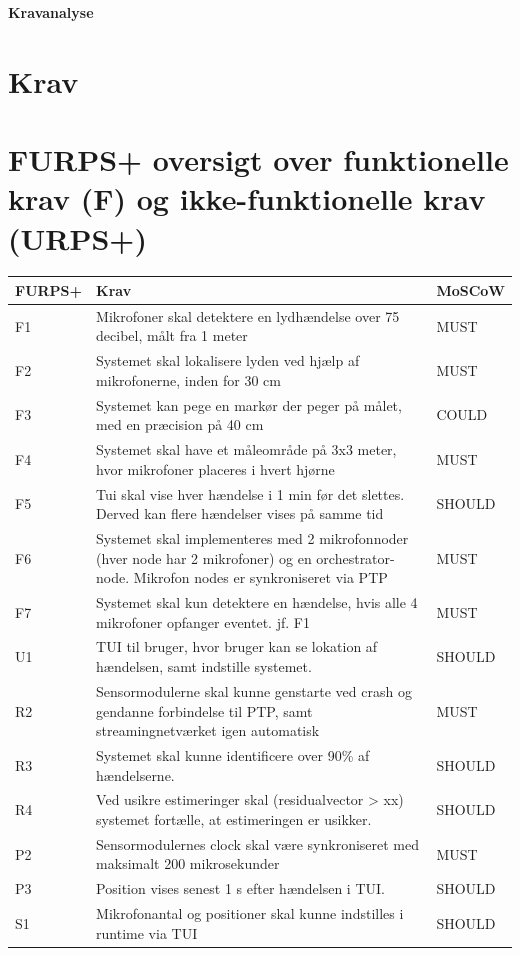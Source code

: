 \documentclass[10pt,addpoints,answers]{exam}
\begin{document}
\begin{center}
{\Huge \textbf{Kravanalyse}\\[0.5em]}
\end{center}

\section*{Krav}




\section*{FURPS+ oversigt over funktionelle krav (F) og ikke-funktionelle krav (URPS+)}
\begin{center}
\renewcommand{\arraystretch}{1.4}
\begin{tabular}{| p{50pt} | p{350pt} | p{50pt} |}
\hline
\textbf{FURPS+} & \textbf{Krav} & \textbf{MoSCoW} \\ \hline
F1 & Mikrofoner skal detektere en lydhændelse over 75 decibel, målt fra 1 meter & MUST \\ \hline
F2 & Systemet skal lokalisere lyden ved hjælp af mikrofonerne, inden for 30 cm & MUST \\ \hline
F3 & Systemet kan pege en markør der peger på målet, med en præcision på 40 cm & COULD \\ \hline
F4 & Systemet skal have et måleområde på 3x3 meter, hvor mikrofoner placeres i hvert hjørne & MUST \\ \hline
F5 & Tui skal vise hver hændelse i 1 min før det slettes. Derved kan flere hændelser vises på samme tid & SHOULD \\ \hline
F6 & Systemet skal implementeres med 2 mikrofonnoder (hver node har 2 mikrofoner) og en orchestrator-node. Mikrofon nodes er synkroniseret via PTP & MUST  \\ \hline
F7 & Systemet skal kun detektere en hændelse, hvis alle 4 mikrofoner opfanger eventet. jf. F1 & MUST  \\ \hline
U1 & TUI til bruger, hvor bruger kan se lokation af hændelsen, samt indstille systemet. & SHOULD  \\ \hline
R2 & Sensormodulerne skal kunne genstarte ved crash og gendanne forbindelse til PTP, samt streamingnetværket igen automatisk & MUST  \\ \hline
R3 & Systemet skal kunne identificere over 90\% af hændelserne. & SHOULD  \\ \hline
R4 & Ved usikre estimeringer skal (residualvector > xx) systemet fortælle, at estimeringen er usikker. & SHOULD \\ \hline
P2 & Sensormodulernes clock skal være synkroniseret med maksimalt 200 mikrosekunder & MUST  \\ \hline
P3 & Position vises senest 1 s efter hændelsen i TUI. & SHOULD  \\ \hline
S1 & Mikrofonantal og positioner skal kunne indstilles i runtime via TUI & SHOULD \\
\hline
\end{tabular}
\renewcommand{\arraystretch}{1}
\end{center}
\end{document}
